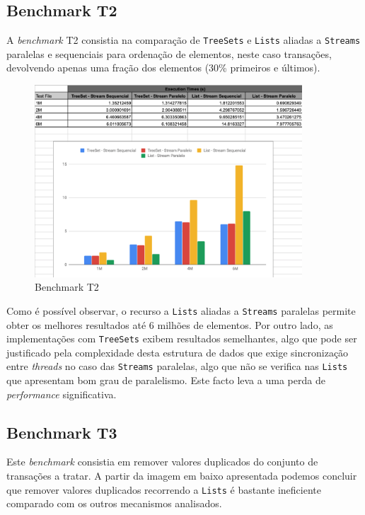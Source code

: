 \documentclass{article}
\begin{document}
\newpage
\subsection{Benchmark T2}
A \textit{benchmark} T2 consistia na comparação de \texttt{TreeSets} e \texttt{Lists} aliadas a \texttt{Streams} paralelas e sequenciais para ordenação de elementos, neste
caso transações, devolvendo apenas uma fração dos elementos (30\% primeiros e últimos).
\begin{figure}[H]
    \centering
    \includegraphics[width=10cm]{Pictures/T2.png}
    \caption{Benchmark T2}
\end{figure}
Como é possível observar, o recurso a \texttt{Lists} aliadas a \texttt{Streams} paralelas
permite obter os melhores resultados até 6 milhões de elementos. Por outro lado, as implementações com \texttt{TreeSets} exibem resultados semelhantes, algo que pode ser justificado pela complexidade desta estrutura de dados que exige sincronização entre \textit{threads} no caso das \texttt{Streams} paralelas, algo que não se verifica nas 
\texttt{Lists} que apresentam bom grau de paralelismo. Este facto leva a uma perda de
\textit{performance} significativa.

\newpage
\subsection{Benchmark T3}
Este \textit{benchmark} consistia em remover valores duplicados do conjunto de transações a tratar. 
A partir da imagem em baixo apresentada podemos concluir que remover valores duplicados recorrendo a \texttt{Lists} é bastante ineficiente comparado com os outros mecanismos analisados.
\end{document}
